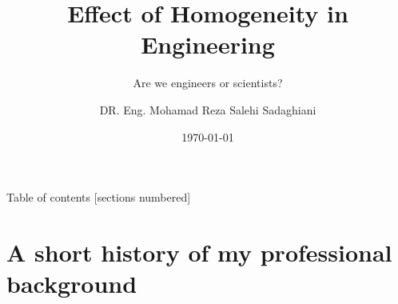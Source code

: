 \documentclass[10pt,xcolor=dvipsnames]{beamer}
\title{Effect of Homogeneity in Engineering}
\subtitle{Are we engineers or scientists?}
\date{\today}
\author{DR. Eng. Mohamad Reza Salehi Sadaghiani}
\institute{Geotechnical and Hydraulical  Engineering}
\begin{document}
\maketitle

 \begin{frame}{Table of contents}
   [sections numbered]
   \tableofcontents[hideallsubsections]
 \end{frame}


{
\usenavigationsymbolstemplate{}
\section{A short history of my professional background}
}
\end{document}
